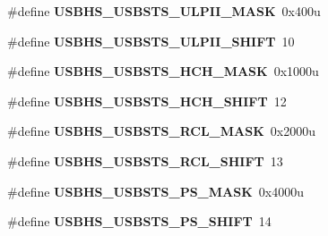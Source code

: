 \begin{DoxyCompactItemize}
\item 
\hypertarget{group___u_s_b_h_s___register___masks_gabfb0e94d5ffdde4701d92e7d650a2674}{}\#define {\bfseries U\+S\+B\+H\+S\+\_\+\+U\+S\+B\+S\+T\+S\+\_\+\+U\+L\+P\+I\+I\+\_\+\+M\+A\+S\+K}~0x400u\label{group___u_s_b_h_s___register___masks_gabfb0e94d5ffdde4701d92e7d650a2674}

\item 
\hypertarget{group___u_s_b_h_s___register___masks_gaa0cbaa7620cc876a8dda05757b12f20e}{}\#define {\bfseries U\+S\+B\+H\+S\+\_\+\+U\+S\+B\+S\+T\+S\+\_\+\+U\+L\+P\+I\+I\+\_\+\+S\+H\+I\+F\+T}~10\label{group___u_s_b_h_s___register___masks_gaa0cbaa7620cc876a8dda05757b12f20e}

\item 
\hypertarget{group___u_s_b_h_s___register___masks_gac040748156b3ec1efe3fe544465f4f62}{}\#define {\bfseries U\+S\+B\+H\+S\+\_\+\+U\+S\+B\+S\+T\+S\+\_\+\+H\+C\+H\+\_\+\+M\+A\+S\+K}~0x1000u\label{group___u_s_b_h_s___register___masks_gac040748156b3ec1efe3fe544465f4f62}

\item 
\hypertarget{group___u_s_b_h_s___register___masks_ga49660645140c8845c78cf095c5865996}{}\#define {\bfseries U\+S\+B\+H\+S\+\_\+\+U\+S\+B\+S\+T\+S\+\_\+\+H\+C\+H\+\_\+\+S\+H\+I\+F\+T}~12\label{group___u_s_b_h_s___register___masks_ga49660645140c8845c78cf095c5865996}

\item 
\hypertarget{group___u_s_b_h_s___register___masks_ga2137a3c0798f028b9c1cf54f4784b55b}{}\#define {\bfseries U\+S\+B\+H\+S\+\_\+\+U\+S\+B\+S\+T\+S\+\_\+\+R\+C\+L\+\_\+\+M\+A\+S\+K}~0x2000u\label{group___u_s_b_h_s___register___masks_ga2137a3c0798f028b9c1cf54f4784b55b}

\item 
\hypertarget{group___u_s_b_h_s___register___masks_gaac49da1bb6d0addd67592f5e9ed23263}{}\#define {\bfseries U\+S\+B\+H\+S\+\_\+\+U\+S\+B\+S\+T\+S\+\_\+\+R\+C\+L\+\_\+\+S\+H\+I\+F\+T}~13\label{group___u_s_b_h_s___register___masks_gaac49da1bb6d0addd67592f5e9ed23263}

\item 
\hypertarget{group___u_s_b_h_s___register___masks_gac11521603e1f64f6e4f11286a038f270}{}\#define {\bfseries U\+S\+B\+H\+S\+\_\+\+U\+S\+B\+S\+T\+S\+\_\+\+P\+S\+\_\+\+M\+A\+S\+K}~0x4000u\label{group___u_s_b_h_s___register___masks_gac11521603e1f64f6e4f11286a038f270}

\item 
\hypertarget{group___u_s_b_h_s___register___masks_gaddba0a8b5d2666e0b4dc16da0cc19868}{}\#define {\bfseries U\+S\+B\+H\+S\+\_\+\+U\+S\+B\+S\+T\+S\+\_\+\+P\+S\+\_\+\+S\+H\+I\+F\+T}~14\label{group___u_s_b_h_s___register___masks_gaddba0a8b5d2666e0b4dc16da0cc19868}


\end{DoxyCompactItemize}
